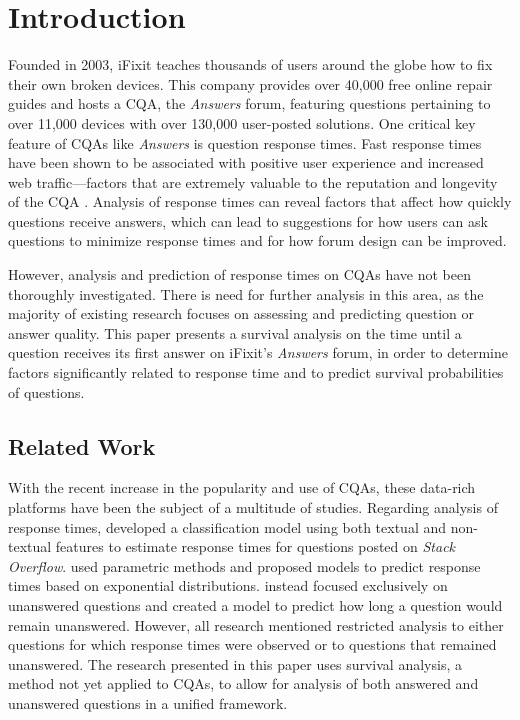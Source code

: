 \documentclass[]{interact}\usepackage[]{graphicx}\usepackage[]{color}
\begin{document}
\section{Introduction}

Founded in 2003, iFixit teaches thousands of users around the globe how to fix their own broken devices. This company provides over 40,000 free online repair guides and hosts a CQA, the \textit{Answers} forum, featuring questions pertaining to over 11,000 devices with over 130,000 user-posted solutions. One critical key feature of CQAs like \textit{Answers} is question response times. Fast response times have been shown to be associated with positive user experience and increased web traffic---factors that are extremely valuable to the reputation and longevity of the CQA \cite{Rechavi2011}. Analysis of response times can reveal factors that affect how quickly questions receive answers, which can lead to suggestions for how users can ask questions to minimize response times and for how forum design can be improved.

However, analysis and prediction of response times on CQAs have not been thoroughly investigated. There is need for further analysis in this area, as the majority of existing research focuses on assessing and predicting question or answer quality. This paper presents a survival analysis on the time until a question receives its first answer on iFixit's \textit{Answers} forum, in order to determine factors significantly related to response time and to predict survival probabilities of questions.


\subsection{Related Work}

With the recent increase in the popularity and use of CQAs, these data-rich platforms have been the subject of a multitude of studies. Regarding analysis of response times, \cite{Bhat2014} developed a classification model using both textual and non-textual features to estimate response times for questions posted on \textit{Stack Overflow}. \cite{Mahmud2013} used parametric methods and proposed models to predict response times based on exponential distributions. \cite{Asaduzzaman2013} instead focused exclusively on unanswered questions and created a model to predict how long a question would remain unanswered. However, all research mentioned restricted analysis to either questions for which response times were observed or to questions that remained unanswered. The research presented in this paper uses survival analysis, a method not yet applied to CQAs, to allow for analysis of both answered and unanswered questions in a unified framework.
\end{document}
